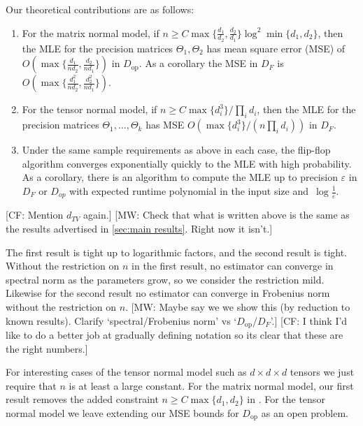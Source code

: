 \documentclass[aos]{imsart}
\theoremstyle{definition}
\numberwithin{equation}{section}
\DeclareMathOperator{\op}{op}
\newcommand{\eps}{\varepsilon}
\newcommand{\CF}[1]{{\color{purple}[CF: #1]}}
\newcommand{\MW}[1]{{\color{red}[MW: #1]}}
\begin{document}
Our theoretical contributions are as follows:
\begin{enumerate}
\item For the matrix normal model, if $n \geq C \max\{\frac{d_1}{d_2},\frac{d_2}{d_1}\} \log^2 \min\{d_1,d_2\}$, then the MLE for the precision matrices $\Theta_1, \Theta_2$ has mean square error (MSE) of $O( \max\{ \frac{d_1}{nd_2}, \frac{d_2}{nd_1} \} )$ in $D_{\op}$.
As a corollary the MSE in $D_F$ is $O( \max \{ \frac{d_1^2}{nd_2}, \frac{d_2^2}{nd_1} \} )$.
\item For the tensor normal model, if $n \geq C \max\{d_i^3\}/ \prod_i d_i$, then the MLE for the precision matrices $\Theta_1, \dots, \Theta_k$ has MSE $O(\max \{ d_i^3 \} / (n \prod_i d_i ) )$ in $D_F$.
\item Under the same sample requirements as above in each case, the flip-flop algorithm converges exponentially quickly to the MLE with high probability. As a corollary, there is an algorithm to compute the MLE up to precision $\eps$ in $D_F$ or $D_{op}$ with expected runtime polynomial in the input size and~$\log\frac1\eps$.
\end{enumerate}
\CF{Mention $d_{TV}$ again.}
\MW{Check that what is written above is the same as the results advertised in \cref{sec:main results}. Right now it isn't.}

The first result is tight up to logarithmic factors, and the second result is tight.
Without the restriction on $n$ in the first result, no estimator can converge in spectral norm as the parameters grow, so we consider the restriction mild. Likewise for the second result no estimator can converge in Frobenius norm without the restriction on $n$.
\MW{Maybe say we we show this (by reduction to known results). Clarify `spectral/Frobenius norm' vs `$D_{\op}$/$D_F$'.}
\CF{I think I'd like to do a better job at gradually defining notation so its clear that these are the right numbers.}

For interesting cases of the tensor normal model such as $d\times d \times d$ tensors we just require that $n$ is at least a large constant.
For the matrix normal model, our first result removes the added constraint $n \geq C \max\{d_1,d_2\}$ in \cite{tsiligkaridis2013convergence}.
For the tensor normal model we leave extending our MSE bounds for $D_{\op}$ as an open problem.
\end{document}
